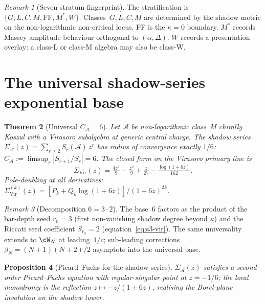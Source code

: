 \documentclass[11pt]{article}
\newtheorem{theorem}{Theorem}[section]
\newtheorem{proposition}[theorem]{Proposition}
\theoremstyle{definition}
\theoremstyle{remark}
\newtheorem{remark}[theorem]{Remark}
\newcommand{\cA}{\mathcal{A}}
\newcommand{\Vir}{\mathrm{Vir}}
\numberwithin{equation}{section}
\begin{document}
\begin{remark}[Seven-stratum fingerprint]
\label{rem:seven-stratum-fingerprint}
The stratification is $\{G, L, C, M, \mathrm{FF}, M^\ast, W\}$.
Classes~$G,L,C,M$ are determined by the shadow metric on the
non-logarithmic non-critical locus. FF is the $\kappa = 0$
boundary. $M^\ast$ records Massey amplitude behaviour
orthogonal to $(\alpha, \Delta)$. $W$ records a presentation
overlay: a class-L or class-M algebra may also be class-W.
\end{remark}

\section{The universal shadow-series exponential base}
\label{sec:universal-exponential-base}

\begin{theorem}[Universal $C_\cA = 6$]
\label{thm:universal-C-A-6-trichotomy}
\ClaimStatusProvedHere
Let $\cA$ be non-logarithmic class~M chirally Koszul with a
Virasoro subalgebra at generic central charge. The shadow series
$\Sigma_\cA(z) = \sum_{r \geq 2} S_r(\cA)\, z^r$
has radius of convergence exactly $1/6$:
$C_\cA := \limsup_r |S_{r+1}/S_r| = 6$.
The closed form on the Virasoro primary line is
\[
\Sigma_{\Vir}(z) =
\tfrac{4z^3}{9} - \tfrac{z^2}{9} + \tfrac{z}{27}
 - \tfrac{\log(1 + 6z)}{162}.
\]
Pole-doubling at all derivatives:
$\Sigma_\Vir^{(k)}(z) = [P_k + Q_k \log(1+6z)]/(1+6z)^{2k}$.
\end{theorem}

\begin{remark}[Decomposition $6 = 3 \cdot 2$]
\label{rem:6-decomposition}
The base~$6$ factors as the product of the bar-depth seed
$r_0 = 3$ (first non-vanishing shadow degree beyond $\kappa$)
and the Riccati seed coefficient $S_{r_0} = 2$
(equation~\eqref{eq:s3-vir}). The same universality extends to
$\cW_N$ at leading~$1/c$; sub-leading corrections
$\beta_N = (N+1)(N+2)/2$ asymptote into the universal base.
\end{remark}

\begin{proposition}[Picard--Fuchs for the shadow series]
\label{prop:picard-fuchs-shadow-trichotomy}
$\Sigma_\cA(z)$ satisfies a second-order Picard--Fuchs equation
with regular-singular point at $z = -1/6$; the local monodromy
is the reflection $z \mapsto -z/(1+6z)$, realising the
Borel-plane involution on the shadow tower.
\end{proposition}
\end{document}
